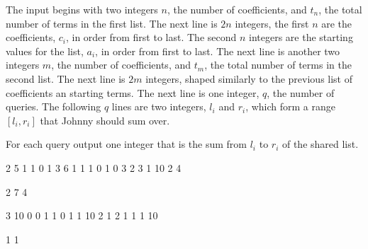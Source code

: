 \begin{formalin}
The input begins with two integers $n$, the number of coefficients, and $t_n$, the total number of terms in the first list.
The next line is $2n$ integers, the first $n$ are the coefficients, $c_i$, in order from first to last.
The second $n$ integers are the starting values for the list, $a_i$, in order from first to last.
The next line is another two integers $m$, the number of coefficients, and $t_m$, the total number of terms in the second list.
The next line is $2m$ integers, shaped similarly to the previous list of coefficients an starting terms.
The next line is one integer, $q$, the number of queries.
The following $q$ lines are two integers, $l_i$ and $r_i$, which form a range $[l_i, r_i]$ that Johnny should sum over.
\end{formalin}

\begin{formalout}
For each query output one integer that is the sum from $l_i$ to $r_i$ of the shared list.
\end{formalout}

\begin{datain}
2 5
1 1 0 1
3 6
1 1 1 0 1 0
3
2 3
1 10
2 4
\end{datain}
\begin{dataout}
2
7
4
\end{dataout}

\begin{datain}
3 10
0 0 1 1 0 1
1 10
2 1
2
1 1
1 10
\end{datain}
\begin{dataout}
1
1
\end{dataout}
